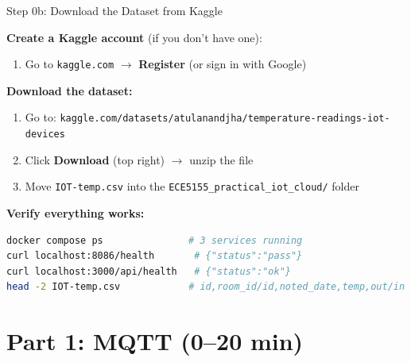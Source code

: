\documentclass[aspectratio=169,11pt]{beamer}
\begin{document}
\begin{frame}[fragile]{Step 0b: Download the Dataset from Kaggle}

    \vspace{0.2cm}
    \textbf{Create a Kaggle account} (if you don't have one):
    \begin{enumerate}
        \item Go to \texttt{kaggle.com} $\rightarrow$ \textbf{Register} (or sign in with Google)
    \end{enumerate}

    \vspace{0.1cm}
    \textbf{Download the dataset:}
    \begin{enumerate}
        \item Go to: {\footnotesize\texttt{kaggle.com/datasets/atulanandjha/temperature-readings-iot-devices}}
        \item Click \textbf{Download} (top right) $\rightarrow$ unzip the file
        \item Move \texttt{IOT-temp.csv} into the \texttt{ECE5155\_practical\_iot\_cloud/} folder
    \end{enumerate}

    \vspace{0.1cm}
    \textbf{Verify everything works:}
\begin{lstlisting}[language=bash]
docker compose ps               # 3 services running
curl localhost:8086/health       # {"status":"pass"}
curl localhost:3000/api/health   # {"status":"ok"}
head -2 IOT-temp.csv            # id,room_id/id,noted_date,temp,out/in
\end{lstlisting}

    \vspace{0.1cm}
\end{frame}

\section{Part 1: MQTT (0--20 min)}
\end{document}
